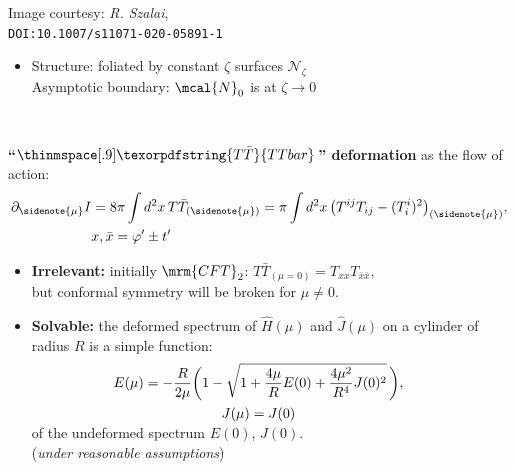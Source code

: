 \documentclass[10pt]{article}
\newcommand{\citations}[1]{{\footnotesize#1\par}}
\newcommand{\TTbar}{\texorpdfstring{\ensuremath{T\bar{T}}}{TTbar}\xspace}
\begin{document}
\begin{multicols}{3}
\begin{center}
	\vspace{-.3\baselineskip}\scriptsize
	Image courtesy: \textsl{R. Szalai},\\
	\tiny\texttt{DOI:10.1007/s11071-020-05891-1}

	\vspace{-.5\baselineskip}
\end{center}
\begin{itemize}
\item Structure: foliated by constant $\zeta$ surfaces ${\mathcal N}_\zeta$\\[.6ex]
Asymptotic boundary: $\mcal{N}_0$ is at $\zeta \to 0$
\\[1ex]
\citations{%
	\textcite{Fefferman:2007rka}\\
	\textcite{Banados:1992wn}%
}
\end{itemize}

\textbf{``$\thinmspace[.9]\TTbar$\,'' deformation} as the flow of action:
\begin{align}
\hspace{-.1em}
	\partial_{\sidenote{\mu}} I &= {8 \pi} \int d^2x \, T\bar T_{(\sidenote{\mu})} = {\pi} \int d^2x\,\big( T^{ij}T_{ij}- (T^i_i)^2 \big)_{(\sidenote{\mu})},\notag\\
	&x, \bar{x} = \varphi' \pm t'
	\label{TTbardef}
\end{align}

\begin{itemize}

\item \textbf{Irrelevant:} initially $\mrm{CFT}_2$: $T\bar{T}_{(\mu = 0)} = T_{xx} T_{\bar{x}\bar{x}}$, \\
but conformal symmetry will be broken for $\mu \ne 0$.

\item \textbf{Solvable:} the deformed spectrum of $\hat{H}(\mu)$ and $\hat{J}(\mu)$ on a cylinder of radius $R$ is a simple function:
\begin{equation}
\hspace{-2em}
\begin{gathered}
	E(\mu) = - \frac{R }{ 2\mu } \bigg(1-\sqrt{1 + \frac{4\mu}{R} E(0) + \frac{4\mu^2}{R^4} J(0)^2 }
	\,\bigg), \\ J(\mu)=J(0) \\[-1.5ex]
\end{gathered} \label{ttbarspectrum}
\end{equation}
of the undeformed spectrum $E(0)$, $J(0)$.\\
(\textit{under reasonable assumptions})


\end{itemize}
\end{multicols}
\end{document}
